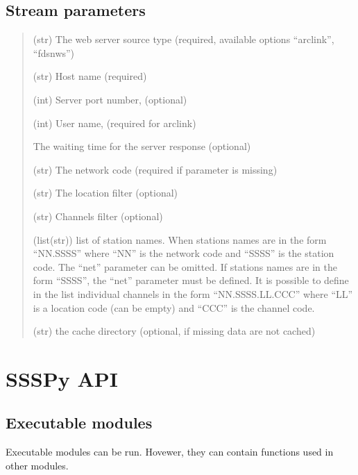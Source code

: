 \documentclass[letterpaper,10pt,english]{sphinxmanual}
\begin{document}
\section{Stream parameters}
\label{\detokenize{configuration:stream-parameters}}\begin{quote}\begin{description}
\sphinxAtStartPar
(str) The web server source type (required, available options “arclink”, “fdsnws”)

\sphinxAtStartPar
(str) Host name (required)

\sphinxAtStartPar
(int) Server port number, (optional)

\sphinxAtStartPar
(int) User name, (required for arclink)

\sphinxAtStartPar
The waiting time for the server response (optional)

\sphinxAtStartPar
(str) The network code (required if  parameter is missing)

\sphinxAtStartPar
(str) The location filter (optional)

\sphinxAtStartPar
(str) Channels filter (optional)

\sphinxAtStartPar
(list(str)) list of station names. When stations names are in the form “NN.SSSS”
where “NN” is the network code and “SSSS” is the station code.
The “net” parameter can be omitted.
If stations names are in the form “SSSS”, the “net” parameter must be defined.
It is possible to define in the list individual channels in the form “NN.SSSS.LL.CCC”
where “LL” is a location code (can be empty) and “CCC” is the channel code.

\sphinxAtStartPar
(str) the cache directory (optional, if missing data are not cached)

\end{description}\end{quote}

\sphinxstepscope


\chapter{SSSPy API}
\label{\detokenize{api:ssspy-api}}\label{\detokenize{api::doc}}
\sphinxstepscope


\section{Executable modules}
\label{\detokenize{api_run:executable-modules}}\label{\detokenize{api_run::doc}}
\sphinxAtStartPar
Executable modules can be run. Hovewer, they can contain functions
used in other modules.
\end{document}
